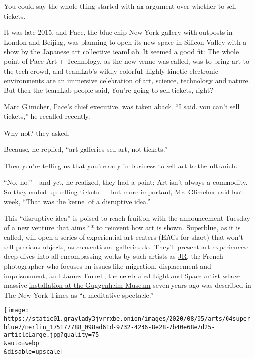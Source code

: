 You could say the whole thing started with an argument over whether to
sell tickets.

It was late 2015, and Pace, the blue-chip New York gallery with outposts
in London and Beijing, was planning to open its new space in Silicon
Valley with a show by the Japanese art collective
\href{https://www.nytimes3xbfgragh.onion/2016/02/04/t-magazine/art/teamlab-living-digital-space-future-parks-pace-gallery-california.html}{teamLab}.
It seemed a good fit: The whole point of Pace Art + Technology, as the
new venue was called, was to bring art to the tech crowd, and teamLab's
wildly colorful, highly kinetic electronic environments are an immersive
celebration of art, science, technology and nature. But then the teamLab
people said, You're going to sell tickets, right?

Marc Glimcher, Pace's chief executive, was taken aback. ``I said, you
can't sell tickets,'' he recalled recently.

Why not? they asked.

Because, he replied, ``art galleries sell art, not tickets.''

Then you're telling us that you're only in business to sell art to the
ultrarich.

``No, no!''---and yet, he realized, they had a point: Art isn't always a
commodity. So they ended up selling tickets --- but more important, Mr.
Glimcher said last week, ``That was the kernel of a disruptive idea.''

This ``disruptive idea'' is poised to reach fruition with the
announcement Tuesday of a new venture that aims ** to reinvent how art
is shown. Superblue, as it is called, will open a series of experiential
art centers (EACs for short) that won't sell precious objects, as
conventional galleries do. They'll present art experiences: deep dives
into all-encompassing works by such artists as
\href{https://www.nytimes3xbfgragh.onion/2014/09/25/arts/design/jr-brings-ellis-islands-abandoned-hospital-to-life.html}{JR},
the French photographer who focuses on issues like migration,
displacement and imprisonment; and James Turrell, the celebrated Light
and Space artist whose massive
\href{https://www.nytimes3xbfgragh.onion/2013/06/21/arts/design/james-turrell-plays-with-color-at-the-guggenheim.html}{installation
at the Guggenheim Museum} seven years ago was described in The New York
Times as ``a meditative spectacle.''

\texttt{[image: https://static01.graylady3jvrrxbe.onion/images/2020/08/05/arts/04superblue7/merlin\_175177788\_098ad61d-9732-4236-8e28-7b40e68e7d25-articleLarge.jpg?quality=75\\\&auto=webp\\\&disable=upscale]}

